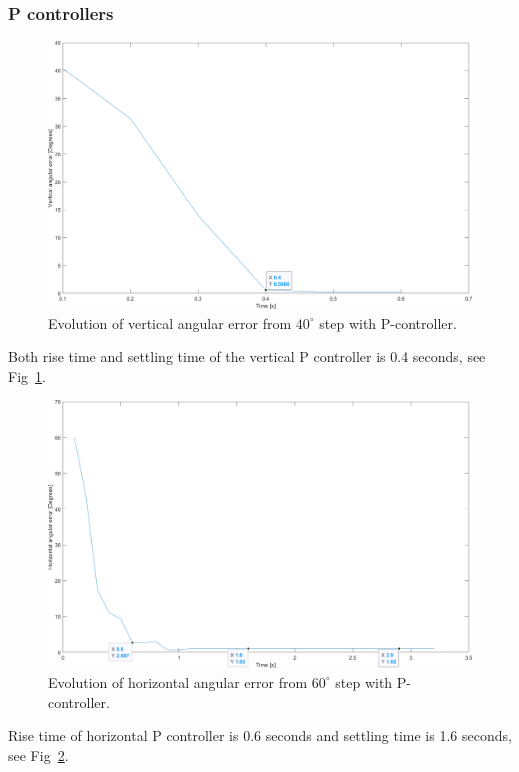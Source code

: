 \subsubsection{P controllers}
\label{sec:simon12}
\begin{figure}[h]
\centering
\includegraphics[width=\linewidth]{sections/assets/Vertical_P_controller.png}
\caption{Evolution of vertical angular error from \(40^{\circ}\) step with P-controller.}
\label{vert_P}
\end{figure}
Both rise time and settling time of the vertical P controller is 0.4 seconds, see Fig~\ref{vert_P}.
\begin{figure}[h]
\centering
\includegraphics[width=\linewidth]{sections/assets/Horizontal_P_controller.png}
\caption{Evolution of horizontal angular error from \(60^{\circ}\) step with P-controller.}
\label{Horizontal_P}
\end{figure}
Rise time of horizontal P controller is 0.6 seconds and settling time is 1.6 seconds, see Fig~\ref{Horizontal_P}.

